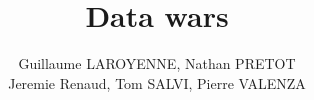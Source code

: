 \documentclass[a4paper,11pt]{report}
\title{Data wars }
\author{Guillaume LAROYENNE, Nathan PRETOT \\ Jeremie Renaud, Tom SALVI, Pierre VALENZA}
\begin{document}
\maketitle
\tableofcontents

\begin{abstract}
\end{abstract}

\chapter{}
\end{document}
